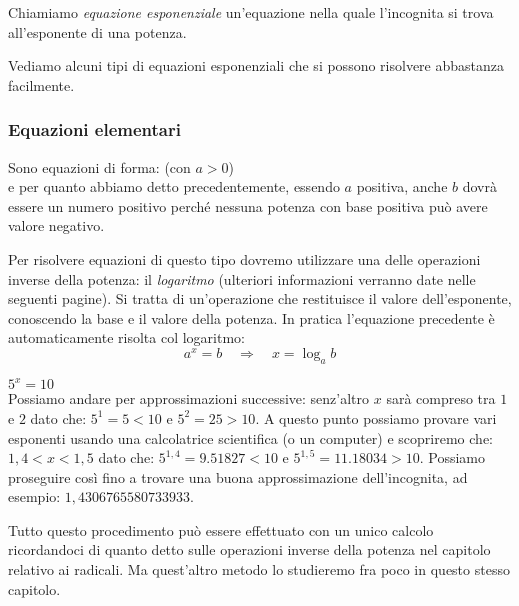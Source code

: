 
\begin{definizione}[Equazioni esponenziali]
Chiamiamo \emph{equazione esponenziale} un'equazione nella quale 
l'incognita si trova all'esponente di una potenza.
\end{definizione}

Vediamo alcuni tipi di equazioni esponenziali che si possono risolvere 
abbastanza facilmente.

\subsubsection{Equazioni elementari}
\label{subsubsec:esplog_eq_elementari}

Sono equazioni di forma: \quad {} \quad (con \(a>0\))\\[4pt]
e per quanto abbiamo detto precedentemente, essendo \(a\) positiva, anche 
\(b\) dovrà essere un numero positivo perché nessuna potenza con base 
positiva può avere valore negativo.

Per risolvere equazioni di questo tipo dovremo utilizzare una delle 
operazioni inverse della potenza: il \emph{logaritmo} (ulteriori 
informazioni verranno date nelle seguenti pagine). 
Si tratta di un'operazione che restituisce il valore dell'esponente, 
conoscendo la base e il valore della potenza. 
In pratica l'equazione precedente è automaticamente risolta col logaritmo:
\[ a^x=b \quad \Longrightarrow \quad x = \log_a b\]

\begin{esempio} \(5^x=10\)\\[4pt]
Possiamo andare per approssimazioni successive:
senz'altro \(x\) sarà compreso tra \(1\) e \(2\) dato che: 
\(5^1 = 5 < 10\) e \(5^2 = 25 > 10\).
A questo punto possiamo provare vari esponenti usando una calcolatrice 
scientifica (o un computer) e scopriremo che: \(1,4 < x < 1,5\) dato che:
\(5^{1,4} = 9.51827 < 10\) e \(5^{1,5} = 11.18034 > 10\).
Possiamo proseguire così fino a trovare una buona approssimazione 
dell'incognita, ad esempio: \(1,4306765580733933\).

Tutto questo procedimento può essere effettuato con un unico calcolo 
ricordandoci di quanto detto sulle operazioni inverse della potenza nel 
capitolo relativo ai radicali.
Ma quest'altro metodo lo studieremo fra poco in questo stesso capitolo.
\end{esempio}

